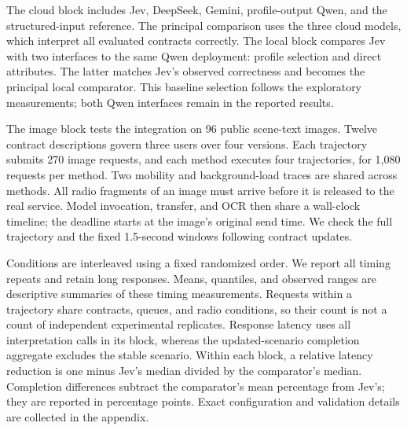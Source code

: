 The cloud block includes Jev, DeepSeek, Gemini, profile-output Qwen, and the structured-input reference. The principal comparison uses the three cloud models, which interpret all evaluated contracts correctly. The local block compares Jev with two interfaces to the same Qwen deployment: profile selection and direct attributes. The latter matches Jev's observed correctness and becomes the principal local comparator. This baseline selection follows the exploratory measurements; both Qwen interfaces remain in the reported results.

The image block tests the integration on 96 public scene-text images. Twelve contract descriptions govern three users over four versions. Each trajectory submits 270 image requests, and each method executes four trajectories, for 1,080 requests per method. Two mobility and background-load traces are shared across methods. All radio fragments of an image must arrive before it is released to the real service. Model invocation, transfer, and OCR then share a wall-clock timeline; the deadline starts at the image's original send time. We check the full trajectory and the fixed 1.5-second windows following contract updates.

Conditions are interleaved using a fixed randomized order. We report all timing repeats and retain long responses. Means, quantiles, and observed ranges are descriptive summaries of these timing measurements. Requests within a trajectory share contracts, queues, and radio conditions, so their count is not a count of independent experimental replicates. Response latency uses all interpretation calls in its block, whereas the updated-scenario completion aggregate excludes the stable scenario. Within each block, a relative latency reduction is one minus Jev's median divided by the comparator's median. Completion differences subtract the comparator's mean percentage from Jev's; they are reported in percentage points. Exact configuration and validation details are collected in the appendix.
